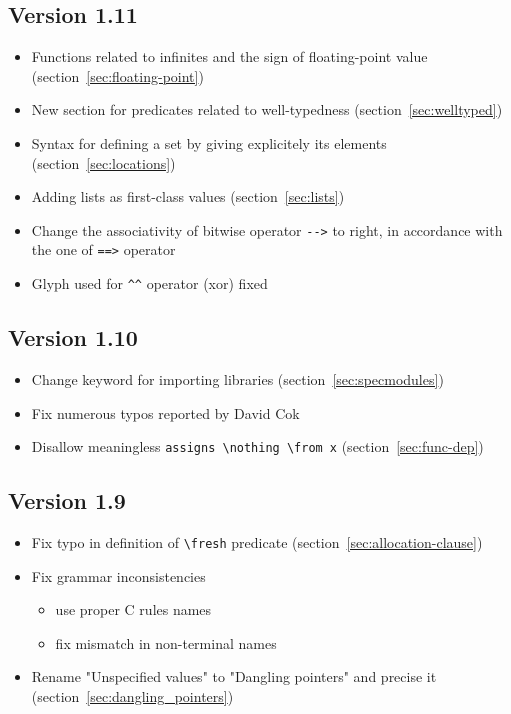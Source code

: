 \documentclass[web]{frama-c-book}
\begin{document}
\subsection{Version 1.11}
\begin{itemize}
\item Functions related to infinites and the sign of floating-point value
  (section~\ref{sec:floating-point})
\item New section for predicates related to well-typedness
  (section~\ref{sec:welltyped})
\item Syntax for defining a set by giving explicitely its elements
(section~\ref{sec:locations})
\item Adding lists as first-class values (section~\ref{sec:lists})
\item Change the associativity of bitwise operator \lstinline|-->| to right, in accordance with the one of \lstinline|==>| operator
\item Glyph used for \lstinline|^^| operator (xor) fixed
\end{itemize}

\subsection{Version 1.10}
\begin{itemize}
\item Change keyword for importing libraries (section~\ref{sec:specmodules})
\item Fix numerous typos reported by David Cok
\item Disallow meaningless \lstinline|assigns \nothing \from x| 
  (section~\ref{sec:func-dep})
\end{itemize}

\subsection{Version 1.9}
\begin{itemize}
\item Fix typo in definition of \lstinline|\fresh| predicate
  (section~\ref{sec:allocation-clause})
\item Fix grammar inconsistencies
  \begin{itemize}
  \item use proper C rules names
  \item fix mismatch in non-terminal names
  \end{itemize}
\item Rename "Unspecified values" to "Dangling pointers" and precise it
  (section~\ref{sec:dangling_pointers})
\end{itemize}
\end{document}
